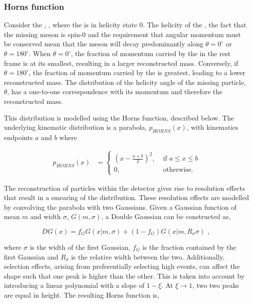 \subsubsection{Horns function}

Consider the \decay{\Bm}{\Dstarz\Kstarm}, \decay{\Dstarz}{\Dz\piz}, where the \Dstarz is in helicity state 0. The helicity of the \Dstarz, the fact that the missing \piz meson is spin-0 and the requirement that angular momentum must be conserved mean that the \piz meson will decay predominantly along $\theta = 0^{\circ}$ or $\theta = 180^{\circ}$. When $\theta = 0^{\circ}$, the fraction of momentum carried by the \piz in the \Bm rest frame is at its smallest, resulting in a larger reconstructed \Bm mass. Conversely, if $\theta = 180^{\circ}$, the fraction of momentum carried by the \piz is greatest, leading to a lower reconstructed \Bm mass. The distribution of the helicity angle of the missing particle, $\theta$, has a one-to-one correspondence with its momentum and therefore the reconstructed \Bm mass. 

This distribution is modelled using the Horns function, described below. The underlying kinematic distribution is a parabola, $p_{HORNS}(x)$, with kinematics endpoints $a$ and $b$ where

\begin{align}
p_{HORNS}(x) &= \begin{cases}
\left(x - \frac{a+b}{2}\right)^2, & \text{ if $a \leq x \leq b$}\\ 	
0, & \text{ otherwise.}
\end{cases} 
\end{align}

The reconstruction of particles within the \lhcb detector gives rise to resolution effects that result in a smearing of the distribution. These resolution effects are modelled by convolving the parabola with two Gaussians. Given a Gaussian function of mean $m$ and width $\sigma$, $G(m,\sigma)$, a Double Gaussian can be constructed as,

\begin{equation}
DG(x) = f_G G(x|m,\sigma) + \left(1-f_G\right) G(x|m,R_{\sigma}\sigma) \text{ , }
\end{equation}

where $\sigma$ is the width of the first Gaussian, $f_G$ is the fraction contained by the first Gaussian and $R_{\sigma}$ is the relative width between the two. Additionally, selection effects, arising from preferentially selecting high \pt events, can affect the shape such that one peak is higher than the other. This is taken into account by introducing a linear polynomial with a slope of $1 - \xi$. At $\xi \rightarrow 1$, two two peaks are equal in height. The resulting Horns function is,

